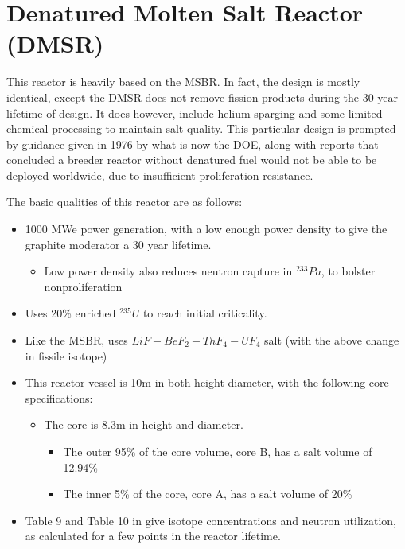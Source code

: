 \documentclass[letterpaper]{article}
\begin{document}
\section{Denatured Molten Salt Reactor (DMSR)}

This reactor is heavily based on the MSBR.  In fact, the design is mostly identical, except the DMSR does not remove fission products during the 30 year lifetime of design.  It does however, include helium sparging and some limited chemical processing to maintain salt quality.  This particular design is prompted by guidance given in 1976 by what is now the DOE, along with reports that concluded a breeder reactor without denatured fuel would not be able to be deployed worldwide, due to insufficient proliferation resistance. \cite{engel_conceptual_1980}

The basic qualities of this reactor are as follows:

\begin{itemize}
\item 1000 MWe power generation, with a low enough power density to give the graphite moderator a 30 year lifetime.
	\begin{itemize}
	\item Low power density also reduces neutron capture in ${}^{233}Pa$, to bolster nonproliferation
	\end{itemize}
\item Uses 20\% enriched ${}^{235}U$ to reach initial criticality.
\item Like the MSBR, uses $LiF - BeF_2 - ThF_4 - UF_4$ salt (with the above change in fissile isotope)
\item This reactor vessel is 10m in both height diameter, with the following core specifications:
	\begin{itemize}
	\item The core is 8.3m in height and diameter.
		\begin{itemize}
		\item The outer 95\% of the core volume, core B, has a salt volume of 12.94\%
		\item The inner 5\% of the core, core A, has a salt volume of 20\%
		\end{itemize}
	\end{itemize}
\item Table 9 and Table 10 in \cite{engel_conceptual_1980} give isotope concentrations and neutron utilization, as calculated for a few points in the reactor lifetime.
\end{itemize}
\end{document}
